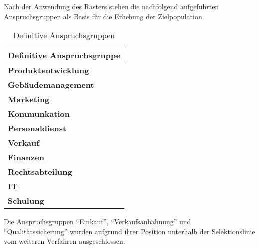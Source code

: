 \begin{sloppypar}
Nach der Anwendung des Rasters stehen die nachfolgend aufgeführten Anspruchsgruppen als Basis für die Erhebung der Zielpopulation.
\end{sloppypar}


\begin{table}[H]
\centering
\caption{Definitive Anspruchsgruppen}
\label{definitive_anspruchsgruppen}


\begin{tabular}{ |p{8cm}| }


\hline
\rowcolor[HTML]{C0C0C0} 
\textbf{Definitive Anspruchsgruppe} \\ 
\hline


\textbf{Produktentwicklung}             \\ \hline
\textbf{Gebäudemanagement}              \\ \hline
\textbf{Marketing}                      \\ \hline
\textbf{Kommunkation}                   \\ \hline
\textbf{Personaldienst}                 \\ \hline
\textbf{Verkauf}                        \\ \hline
\textbf{Finanzen}                       \\ \hline
\textbf{Rechtsabteilung}                \\ \hline
\textbf{IT}                             \\ \hline
\textbf{Schulung}                       \\ \hline

\end{tabular}
\end{table}

\begin{sloppypar}
Die Anspruchsgruppen "`Einkauf"', "`Verkaufsanbahnung"' und "`Qualitätssicherung"' wurden aufgrund ihrer Position unterhalb der Selektionslinie vom weiteren Verfahren ausgeschlossen.
\end{sloppypar}